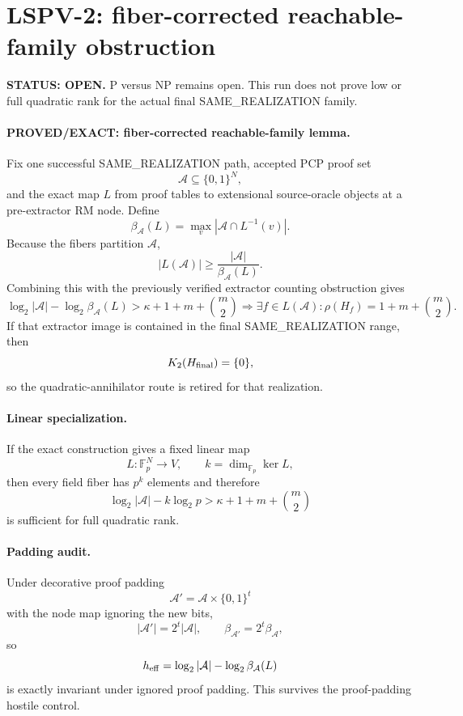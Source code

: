 \documentclass[11pt]{article}
\begin{document}
\section*{LSPV-2: fiber-corrected reachable-family obstruction}

\textbf{STATUS: OPEN.} P versus NP remains open. This run does not prove low or full quadratic rank for the actual final SAME\_REALIZATION family.

\paragraph{PROVED/EXACT: fiber-corrected reachable-family lemma.}
Fix one successful SAME\_REALIZATION path, accepted PCP proof set
\[
\mathcal A\subseteq\{0,1\}^N,
\]
and the exact map \(L\) from proof tables to extensional source-oracle objects at a pre-extractor RM node. Define
\[
\beta_{\mathcal A}(L)=\max_v |\mathcal A\cap L^{-1}(v)|.
\]
Because the fibers partition \(\mathcal A\),
\[
\boxed{
|L(\mathcal A)|\ge
\frac{|\mathcal A|}{\beta_{\mathcal A}(L)}.
}
\]
Combining this with the previously verified extractor counting obstruction gives
\[
\boxed{
\log_2|\mathcal A|
-\log_2\beta_{\mathcal A}(L)
>
\kappa+1+m+\binom m2
\Longrightarrow
\exists f\in L(\mathcal A):
\rho(H_f)=1+m+\binom m2.
}
\]
If that extractor image is contained in the final SAME\_REALIZATION range, then
\[
K_2(H_{\rm final})=\{0\},
\]
so the quadratic-annihilator route is retired for that realization.

\paragraph{Linear specialization.}
If the exact construction gives a fixed linear map
\[
L:\mathbb F_p^N\to V,
\qquad
k=\dim_{\mathbb F_p}\ker L,
\]
then every field fiber has \(p^k\) elements and therefore
\[
\boxed{
\log_2|\mathcal A|-k\log_2p
>
\kappa+1+m+\binom m2
}
\]
is sufficient for full quadratic rank.

\paragraph{Padding audit.}
Under decorative proof padding
\[
\mathcal A'=\mathcal A\times\{0,1\}^t
\]
with the node map ignoring the new bits,
\[
|\mathcal A'|=2^t|\mathcal A|,
\qquad
\beta_{\mathcal A'}=2^t\beta_{\mathcal A},
\]
so
\[
h_{\rm eff}
=
\log_2|\mathcal A|-\log_2\beta_{\mathcal A}(L)
\]
is exactly invariant under ignored proof padding. This survives the proof-padding hostile control.
\end{document}
